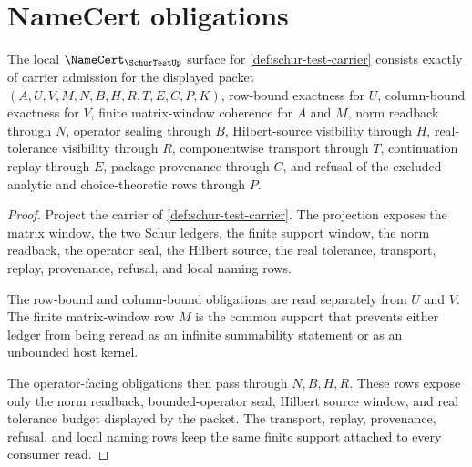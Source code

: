 \section{NameCert obligations}
\label{sec:schur-test-namecert-obligations}

\begin{theorem}
\label{thm:schur-test-namecert-obligations}
The local $\NameCert_{\SchurTestUp}$ surface for \autoref{def:schur-test-carrier} consists exactly of carrier admission for the displayed packet $(A,U,V,M,N,B,H,R,T,E,C,P,K)$, row-bound exactness for $U$, column-bound exactness for $V$, finite matrix-window coherence for $A$ and $M$, norm readback through $N$, operator sealing through $B$, Hilbert-source visibility through $H$, real-tolerance visibility through $R$, componentwise transport through $T$, continuation replay through $E$, package provenance through $C$, and refusal of the excluded analytic and choice-theoretic rows through $P$.
\end{theorem}
\begin{proof}
Project the carrier of \autoref{def:schur-test-carrier}. The projection exposes the matrix window, the two Schur ledgers, the finite support window, the norm readback, the operator seal, the Hilbert source, the real tolerance, transport, replay, provenance, refusal, and local naming rows.

The row-bound and column-bound obligations are read separately from $U$ and $V$. The finite matrix-window row $M$ is the common support that prevents either ledger from being reread as an infinite summability statement or as an unbounded host kernel.

The operator-facing obligations then pass through $N,B,H,R$. These rows expose only the norm readback, bounded-operator seal, Hilbert source window, and real tolerance budget displayed by the packet. The transport, replay, provenance, refusal, and local naming rows keep the same finite support attached to every consumer read.
\end{proof}

